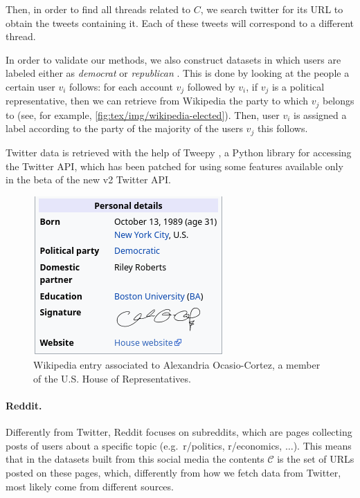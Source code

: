 Then, in order to find all threads related to $C$, we search twitter for
its URL to obtain the tweets containing it. Each of these tweets
will correspond to a different thread.

\medskip

In order to validate our methods, we also construct datasets in which users are labeled either as
\emph{democrat} or \emph{republican} \footnotemark. This is done by looking at the people a
certain user $v_i$ follows: for each account $v_j$ followed by $v_i$, if $v_j$ is a political representative, then we can
retrieve from Wikipedia the party to which $v_j$ belongs to (see, for
example, \autoref{fig:tex/img/wikipedia-elected}). Then, user $v_i$ is assigned a
label according to the party of the majority of the users $v_j$ this
follows.

Twitter data is retrieved with the help of Tweepy \cite{tweepy}, a Python
library for accessing the Twitter API, which has been patched for using some
features available only in the beta of the new v2 Twitter API.


\begin{figure}
	\centering
	\includegraphics[width=0.4\linewidth]{tex/img/wikipedia-elected.png}
	\caption[Example Wikipedia entry]{Wikipedia entry associated to Alexandria Ocasio-Cortez, a member
		of the U.S. House of Representatives.}%
	\label{fig:tex/img/wikipedia-elected}
\end{figure}

\paragraph{Reddit.}%
\label{par:reddit}

Differently from Twitter, Reddit focuses on subreddits, which are pages
collecting posts of users about a specific topic (e.g.\ r/politics,
r/economics, $\dots$). This means that
in the datasets built from this social media the contents $\mathcal{C} $ is the
set of URLs posted on these pages, which, differently from how we fetch data
from Twitter, most likely
come from different sources.

